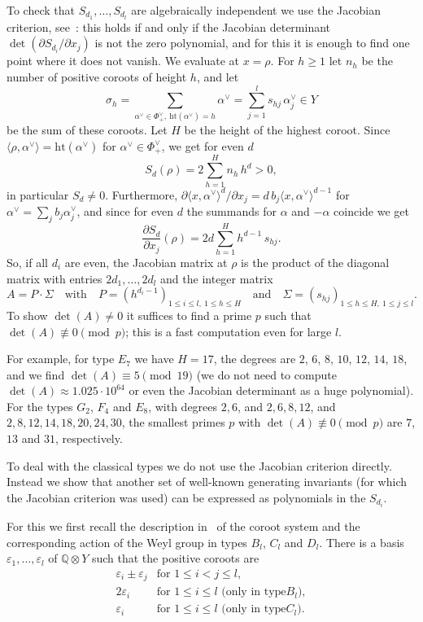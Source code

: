 \documentclass[11pt,a4paper]{article}
\theoremstyle{plain}
\theoremstyle{definition}
\newcommand{\hgt}{ \textrm{ht} }
\newcommand{\Q}{\mathbb{Q}}
\begin{document}
To check that $S_{d_1}, \ldots, S_{d_l}$ are algebraically independent we
use the Jacobian criterion, see~\cite[3.10]{humrg}: this holds if and only
if the Jacobian determinant $\det(\partial S_{d_i} / \partial x_j)$ is not
the zero polynomial, and for this it is enough to find one point where it
does not vanish. We evaluate at $x = \rho$. For $h \geq 1$ let $n_h$ be the
number of positive coroots of height $h$, and let
\[ \sigma_h = \sum_{\alpha^\vee \in \Phi^\vee_+,\ \hgt(\alpha^\vee) = h}
\alpha^\vee = \sum_{j=1}^l s_{hj}\, \alpha_j^\vee \in Y \]
be the sum of these coroots. Let $H$ be the height of the highest coroot.
Since $\langle \rho, \alpha^\vee \rangle = \hgt(\alpha^\vee)$ for
$\alpha^\vee \in \Phi^\vee_+$, we get for even $d$
\[ S_d(\rho) = 2 \sum_{h=1}^H n_h\, h^d > 0, \]
in particular $S_d \neq 0$. Furthermore, $\partial \langle x, \alpha^\vee
\rangle^d / \partial x_j = d\, b_j \langle x, \alpha^\vee \rangle^{d-1}$
for $\alpha^\vee = \sum_j b_j \alpha_j^\vee$, and since for even $d$ the
summands for $\alpha$ and $-\alpha$ coincide we get
\[ \frac{\partial S_d}{\partial x_j}(\rho) = 2d \sum_{h=1}^H h^{d-1}\,
s_{hj}. \]
So, if all $d_i$ are even, the Jacobian matrix at $\rho$ is the product of
the diagonal matrix with entries $2d_1, \ldots, 2d_l$ and the integer
matrix
\[ A = P \cdot \Sigma \quad \textrm{with} \quad P = \left(h^{d_i - 1}\right)_{1
\leq i \leq l,\ 1 \leq h \leq H} \quad \textrm{and} \quad 
\Sigma = \left(s_{hj}\right)_{1 \leq h \leq H,\ 1 \leq j \leq l}. \]
To show $\det(A) \neq 0$ it suffices to find a prime $p$ such that
$\det(A) \not\equiv 0 \pmod p$; this is a fast computation even for large
$l$.

For example, for type $E_7$ we have $H = 17$, the degrees are $2$, $6$, $8$, $10$,
$12$, $14$, $18$, and we find $\det(A)
\equiv 5 \pmod{19}$ (we do not need to compute  $\det(A) \approx 1.025 \cdot
10^{64}$ or even the Jacobian determinant as a huge polynomial). 
For the types $G_2$, $F_4$ and $E_8$, with degrees
$2, 6$, and $2, 6, 8, 12$, and $2, 8, 12, 14, 18, 20, 24, 30$, the
smallest primes $p$ with $\det(A) \not\equiv 0 \pmod p$ are $7$, $13$ and
$31$, respectively.

To deal with the classical types we do not use the Jacobian criterion
directly. Instead we show that another set of well-known generating
invariants (for which the Jacobian criterion was used) 
can be expressed as polynomials in the $S_{d_i}$. 

For this we first recall the description in~\cite[Planches]{bou} of 
the coroot system and the
corresponding action of the Weyl group in types $B_l$, $C_l$ and $D_l$.
There is a basis $\varepsilon_1, \ldots, \varepsilon_l$ of 
$\Q \otimes Y$ such that the positive coroots are
\[ \begin{array}{ll}
\varepsilon_i \pm \varepsilon_j & \textrm{for }1 \leq i < j \leq l,\\
2\varepsilon_i &  \textrm{for }1 \leq i \leq l \textrm{ (only in type
$B_l$)},\\
\varepsilon_i &  \textrm{for }1 \leq i \leq l \textrm{ (only in type
$C_l$)}.
\end{array}
\]
\end{document}
